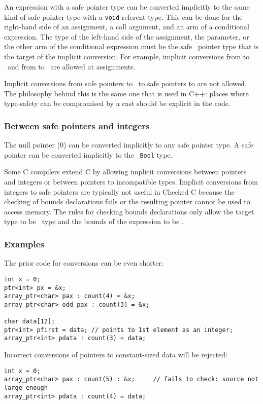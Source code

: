 An expression with a safe pointer type can be converted implicitly to the same kind
of safe pointer type with a \texttt{void} referent type.   
This can be done for the right-hand side of an assignment, a call argument, 
and an arm of a conditional expression.  
The type of the left-hand side of the assignment, the parameter, or the other
arm of the conditional expression
must be the safe \void\ pointer type that is the target of the implicit
conversion. For example, implicit conversions from 
 to \ptrvoid\ and from  to \arrayptrvoid\ are allowed 
at assignments. 

Implicit conversions from safe pointers to \void\ to safe pointers to  are not allowed.
The philosophy behind this is the same one that is used in C++: places where type-safety
can be compromised by a cast should be explicit in the code.

\subsubsection{Between safe pointers and integers}

The null pointer (0) can be converted implicitly to any safe pointer type.   
A safe pointer can be converted implicitly to the \texttt{\_Bool} type.

Some C compilers extend C by allowing implicit conversions between pointers
and integers or between pointers to incompatible types.  Implicit conversions
from integers to safe pointers are typically not useful in Checked C because
the checking of bounds declarations fails or the resulting pointer cannot
be used to access memory.   The rules for checking bounds declarations only
allow the target type to be \arrayptr\ type and the bounds of the expression to be
\boundsnone.


\subsubsection{Examples}

The prior code for conversions can be even shorter:
\begin{verbatim}
int x = 0;
ptr<int> px = &x;
array_ptr<char> pax : count(4) = &x;
array_ptr<char> odd_pax : count(3) = &x;

char data[12];
ptr<int> pfirst = data; // points to 1st element as an integer;
array_ptr<int> pdata : count(3) = data;
\end{verbatim}
Incorrect conversions of pointers to constant-sized data will be rejected:
\begin{verbatim}
int x = 0;
array_ptr<char> pax : count(5) : &x;     // fails to check: source not large enough
array_ptr<int> pdata : count(4) = data;
\end{verbatim}

